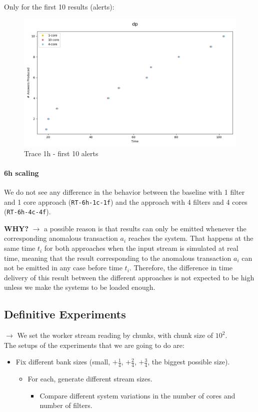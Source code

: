 \documentclass[12pt,a4paper]{article}
\begin{document}
Only for the first 10 results (alerts):
\begin{figure}[H]
  \centering
  \includegraphics[scale = 0.5]{images/4-Experiments/traces-1h-10.png}
  \caption{Trace 1h - first 10 alerts}
\end{figure}

\paragraph{6h scaling\\}

We do not see any difference in the behavior between the baseline with 1 filter and 1 core approach (\texttt{RT-6h-1c-1f}) and the approach with 4 filters and 4 cores (\texttt{RT-6h-4c-4f}). 

\textbf{WHY?} $\rightarrow$ a possible reason is that results can only be emitted whenever the corresponding anomalous transaction $a_i$ reaches the system. That happens at the same time $t_i$ for both approaches when the input stream is simulated at real time, meaning that the result corresponding to the anomalous transaction $a_i$ can not be emitted in any case before time $t_i$. Therefore, the difference in time delivery of this result between the different approaches is not expected to be high unless we make the systems to be loaded enough.

\subsection{Definitive Experiments}

$\rightarrow$ We set the worker stream reading by chunks, with chunk size of $10^2$.\\

The setups of the experiments that we are going to do are:
\begin{itemize}
  \item Fix different bank sizes (small, $+\frac{1}{4}$, $+\frac{2}{4}$, $+\frac{3}{4}$, the biggest possible size).
  \begin{itemize}
    \item For each, generate different stream sizes.
    \begin{itemize}
      \item Compare different system variations in the number of cores and number of filters.
    \end{itemize}
  \end{itemize}
\end{itemize}
\end{document}
